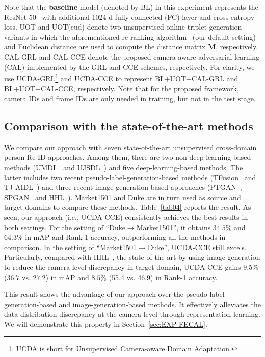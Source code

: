 \documentclass[10pt,twocolumn,letterpaper]{article}
\begin{document}
Note that the \textbf{baseline} model (denoted by BL) in this experiment represents the ResNet-50~\cite{DBLP:conf/cvpr/HeZRS16} with additional 1024-d fully connected (FC) layer and cross-entropy loss. UOT and UOT(eud) denote two unsupervised online triplet generation variants in which the aforementioned re-ranking algorithm~\cite{DBLP:conf/cvpr/ZhongZCL17} (our default setting) and Euclidean distance are used to compute the distance matrix ${\mathbf M}$, respectively. CAL-GRL and CAL-CCE denote the proposed camera-aware adversarial learning (CAL) implemented by the GRL and CCE schemes, respectively. For clarity, we use UCDA-GRL\footnote{UCDA is short for Unsupervised Camera-aware Domain Adaptation.} and UCDA-CCE to represent BL+UOT+CAL-GRL and BL+UOT+CAL-CCE, respectively. Note that for the proposed framework, camera IDs and frame IDs are only needed in training, but not in the test stage. 
 
 
\subsection{Comparison with the state-of-the-art methods}\label{sec:EXP-CSM}
We compare our approach with seven state-of-the-art unsupervised cross-domain person Re-ID approaches. Among them, there are two non-deep-learning-based methods (UMDL~\cite{DBLP:conf/cvpr/PengXWPGHT16} and UJSDL~\cite{qi2018unsupervised}) and five deep-learning-based methods. The latter includes two recent pseudo-label-generation-based methods (TFusion~\cite{lv2018unsupervised} and TJ-AIDL~\cite{wang2018transferable}) and three recent image-generation-based approaches (PTGAN~\cite{wei2018person}, SPGAN~\cite{deng2018image} and HHL~\cite{zhong2018generalizing}). Market1501 and Duke are in turn used as source and target domains to compare these methods. Table~\ref{tab04} reports the result. As seen, our approach (i.e., UCDA-CCE) consistently achieves the best results in both settings. For the setting of ``Duke$\rightarrow$Market1501'', it obtains $34.5\%$ and $64.3\%$ in mAP and Rank-1 accuracy, outperforming all the methods in comparison. In the setting of ``Market1501$\rightarrow$Duke'', UCDA-CCE still excels. Particularly, compared with HHL~\cite{zhong2018generalizing}, the state-of-the-art by using image generation to reduce the camera-level discrepancy in target domain, UCDA-CCE gains $9.5\%$ ($36.7$ vs. $27.2$) in mAP and $8.5\%$ (55.4 vs. 46.9) in Rank-1 accuracy. 
 
This result shows the advantage of our approach over the pseudo-label-generation-based and image-generation-based methods. It effectively alleviates the data distribution discrepancy at the camera level through representation learning. We will demonstrate this property in Section~\ref{sec:EXP-FECAL}.
 
\end{document}
